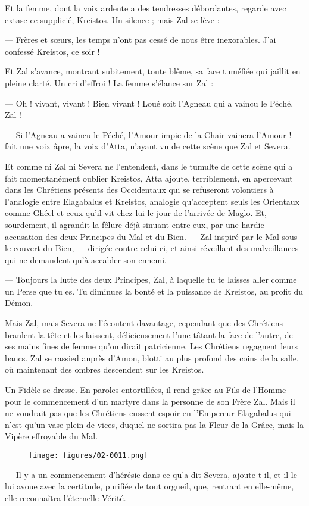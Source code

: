 \documentclass[a4paper, 11pt, oneside, polutonikogreek, french]{article}
\begin{document}
Et la femme, dont la voix ardente a des tendresses débordantes, regarde avec extase ce supplicié, Kreistos. Un silence ; mais Zal se lève :

--- Frères et sœurs, les temps n'ont pas cessé de nous être inexorables. J'ai confessé Kreistos, ce soir !

Et Zal s'avance, montrant subitement, toute blême, sa face tuméfiée qui jaillit en pleine clarté. Un cri d'effroi ! La femme s'élance sur Zal :

--- Oh ! vivant, vivant ! Bien vivant ! Loué soit l'Agneau qui a vaincu le Péché, Zal !

--- Si l'Agneau a vaincu le Péché, l'Amour impie de la Chair vaincra l'Amour ! fait une voix âpre, la voix d'Atta, n'ayant vu de cette scène que Zal et Severa.

Et comme ni Zal ni Severa ne l'entendent, dans le tumulte de cette scène qui a fait momentanément oublier Kreistos, Atta ajoute, terriblement, en apercevant dans les Chrétiens présents des Occidentaux qui se refuseront volontiers à l'analogie entre Elagabalus et Kreistos, analogie qu'acceptent seuls les Orientaux comme Ghéel et ceux qu'il vit chez lui le jour de l'arrivée de Maglo. Et, sourdement, il agrandit la fêlure déjà sinuant entre eux, par une hardie accusation des deux Principes du Mal et du Bien. --- Zal inspiré par le Mal sous le couvert du Bien, --- dirigée contre celui-ci, et ainsi réveillant des malveillances qui ne demandent qu'à accabler son ennemi.

--- Toujours la lutte des deux Principes, Zal, à laquelle tu te laisses aller comme un Perse que tu es. Tu diminues la bonté et la puissance de Kreistos, au profit du Démon.

Mais Zal, mais Severa ne l'écoutent davantage, cependant que des Chrétiens branlent la tête et les laissent, délicieusement l'une tâtant la face de l'autre, de ses mains fines de femme qu'on dirait patricienne. Les Chrétiens regagnent leurs bancs. Zal se rassied auprès d'Amon, blotti au plus profond des coins de la salle, où maintenant des ombres descendent sur les Kreistos.

Un Fidèle se dresse. En paroles entortillées, il rend grâce au Fils de l'Homme pour le commencement d'un martyre dans la personne de son Frère Zal. Mais il ne voudrait pas que les Chrétiens eussent espoir en l'Empereur Elagabalus qui n'est qu'un vase plein de vices, duquel ne sortira pas la Fleur de la Grâce, mais la Vipère effroyable du Mal.
\begin{figure}[H]
\centering
\texttt{[image: figures/02-0011.png]}
\end{figure}
--- Il y a un commencement d'hérésie dans ce qu'a dit Severa, ajoute-t-il, et il le lui avoue avec la certitude, purifiée de tout orgueil, que, rentrant en elle-même, elle reconnaîtra l'éternelle Vérité.
\end{document}
